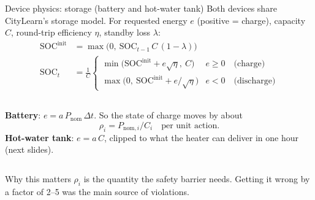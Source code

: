 \documentclass[aspectratio=169,10pt]{beamer}
\newcommand{\SOC}{\mathrm{SOC}}
\begin{document}
\begin{frame}{Device physics: storage (battery and hot-water tank)}
Both devices share CityLearn's storage model. For requested energy $e$ (positive = charge), capacity $C$, round-trip efficiency $\eta$, standby loss $\lambda$:
\begin{align*}
\SOC^{\text{init}} &= \max\big(0,\ \SOC_{t-1}\, C\,(1-\lambda)\big)\\[2pt]
\SOC_t &= \frac{1}{C}
\begin{cases}
\min\big(\SOC^{\text{init}} + e\sqrt{\eta},\ C\big) & e \ge 0 \quad\text{(charge)}\\[2pt]
\max\big(0,\ \SOC^{\text{init}} + e/\sqrt{\eta}\big) & e < 0 \quad\text{(discharge)}
\end{cases}
\end{align*}
\begin{columns}[T]
\textbf{Battery}: $e = a\,P_{\text{nom}}\,\Delta t$. So the state of charge moves by about
\[
\rho_i = P_{\text{nom},i}/C_i \quad\text{per unit action.}
\]
\textbf{Hot-water tank}: $e = a\,C$, clipped to what the heater can deliver in one hour (next slides).
\end{columns}
\vspace{0.4em}
\begin{block}{Why this matters}
$\rho_i$ is the quantity the safety barrier needs. Getting it wrong by a factor of 2--5 was the main source of violations.
\end{block}
\end{frame}
\end{document}
